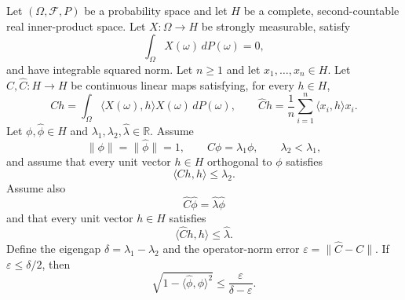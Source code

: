 \begin{theorem}
Let $(\Omega,\mathcal F,P)$ be a probability space and let $H$ be a
complete, second-countable real inner-product space.  Let
$X:\Omega\to H$ be strongly measurable, satisfy
\[
  \int_\Omega X(\omega)\,dP(\omega)=0,
\]
and have integrable squared norm.  Let $n\ge1$ and let
$x_1,\ldots,x_n\in H$.  Let $C,\widehat C:H\to H$ be continuous linear
maps satisfying, for every $h\in H$,
\[
  Ch=\int_\Omega\langle X(\omega),h\rangle X(\omega)\,dP(\omega),
  \qquad
  \widehat Ch=\frac1n\sum_{i=1}^n\langle x_i,h\rangle x_i.
\]
Let $\phi,\widehat\phi\in H$ and
$\lambda_1,\lambda_2,\widehat\lambda\in\mathbb R$.  Assume
\[
  \|\phi\|=\|\widehat\phi\|=1,
  \qquad C\phi=\lambda_1\phi,
  \qquad \lambda_2<\lambda_1,
\]
and assume that every unit vector $h\in H$ orthogonal to $\phi$ satisfies
\[
  \langle Ch,h\rangle\le\lambda_2.
\]
Assume also
\[
  \widehat C\widehat\phi=\widehat\lambda\widehat\phi
\]
and that every unit vector $h\in H$ satisfies
\[
  \langle\widehat Ch,h\rangle\le\widehat\lambda.
\]
Define the eigengap $\delta=\lambda_1-\lambda_2$ and the operator-norm
error $\varepsilon=\|\widehat C-C\|$.  If
$\varepsilon\le\delta/2$, then
\[
  \sqrt{1-\langle\widehat\phi,\phi\rangle^2}
  \le\frac{\varepsilon}{\delta-\varepsilon}.
\]
\end{theorem}
